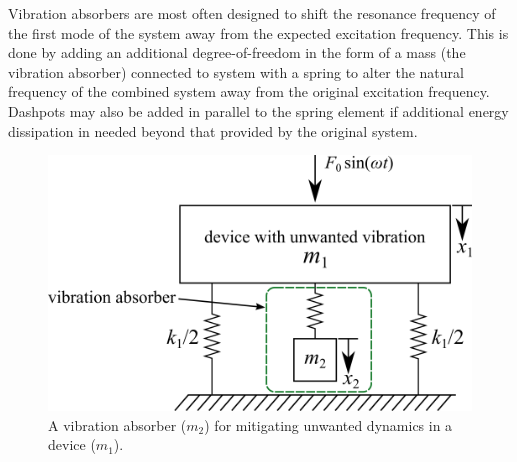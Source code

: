 \documentclass[12pt,letter]{article}
\numberwithin{ex}{section} %
\numberwithin{re}{section} %
\begin{document}
Vibration absorbers are most often designed to shift the resonance frequency of the first mode of the system away from the expected excitation frequency. This is done by adding an additional degree-of-freedom in the form of a mass (the vibration absorber) connected to system with a spring to alter the natural frequency of the combined system away from the original excitation frequency. Dashpots may also be added in parallel to the spring element if additional energy dissipation in needed beyond that provided by the original system. 

\begin{figure}[H]
    \centering
    \includegraphics[]{../Figures/vibration_absorber_spring_mass.png}
    \caption{A vibration absorber ($m_2$) for mitigating unwanted dynamics in a device ($m_1$).}
    \label{fig:vibration_absorber_spring_mass}
\end{figure}
\end{document}
